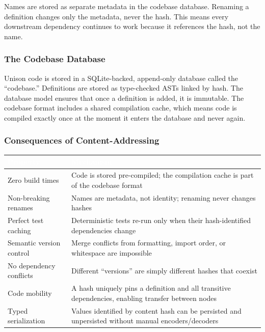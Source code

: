\documentclass[11pt,letterpaper]{article}
\newcommand{\tableheader}[1]{\textbf{\sffamily\textcolor{white}{#1}}}
\begin{document}
Names are stored as separate metadata in the codebase database. Renaming a definition changes only the metadata, never the hash. This means every downstream dependency continues to work because it references the hash, not the name.

\subsubsection{The Codebase Database}

Unison code is stored in a SQLite-backed, append-only database called the ``codebase.'' Definitions are stored as type-checked ASTs linked by hash. The database model ensures that once a definition is added, it is immutable. The codebase format includes a shared compilation cache, which means code is compiled exactly once at the moment it enters the database and never again.

\subsubsection{Consequences of Content-Addressing}

\begin{center}
\begin{tabularx}{\textwidth}{L{3.5cm}X}
\toprule
{}
\tableheader{Property} & \tableheader{Mechanism} \\
\midrule
Zero build times & Code is stored pre-compiled; the compilation cache is part of the codebase format \\
Non-breaking renames & Names are metadata, not identity; renaming never changes hashes \\
Perfect test caching & Deterministic tests re-run only when their hash-identified dependencies change \\
Semantic version control & Merge conflicts from formatting, import order, or whitespace are impossible \\
No dependency conflicts & Different ``versions'' are simply different hashes that coexist \\
Code mobility & A hash uniquely pins a definition and all transitive dependencies, enabling transfer between nodes \\
Typed serialization & Values identified by content hash can be persisted and unpersisted without manual encoders/decoders \\
\bottomrule
\end{tabularx}
\end{center}
\end{document}
